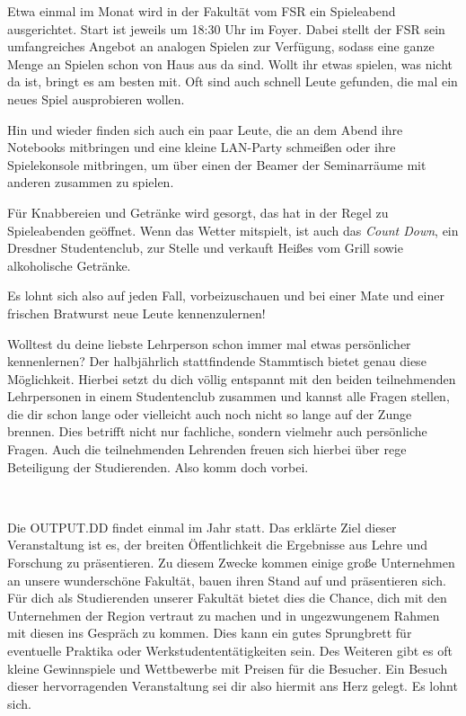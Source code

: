 

Etwa einmal im Monat wird in der Fakultät vom FSR ein Spieleabend ausgerichtet. Start ist jeweils um 18:30 Uhr im Foyer. Dabei stellt der FSR sein umfangreiches Angebot an analogen Spielen zur Verfügung, sodass eine ganze Menge an Spielen schon von Haus aus da sind. Wollt ihr etwas spielen, was nicht da ist, bringt es am besten mit. Oft sind auch schnell Leute gefunden, die mal ein neues Spiel ausprobieren wollen.

Hin und wieder finden sich auch ein paar Leute, die an dem Abend ihre Notebooks mitbringen und eine kleine LAN-Party schmeißen oder ihre Spielekonsole mitbringen, um über einen der Beamer der Seminarräume mit anderen zusammen zu spielen.

Für Knabbereien und Getränke wird gesorgt, das \ascii{} hat in der Regel zu Spieleabenden geöffnet. Wenn das Wetter mitspielt, ist auch das \emph{Count Down}, ein Dresdner Studentenclub, zur Stelle und verkauft Heißes vom Grill sowie alkoholische Getränke.

Es lohnt sich also auf jeden Fall, vorbeizuschauen und bei einer Mate und einer frischen Bratwurst neue Leute kennenzulernen!


Wolltest du deine liebste Lehrperson schon immer mal etwas persönlicher kennenlernen? Der halbjährlich stattfindende Stammtisch bietet genau diese Möglichkeit. Hierbei setzt du dich völlig entspannt mit den beiden teilnehmenden Lehrpersonen in einem Studentenclub zusammen und kannst alle Fragen stellen, die dir schon lange oder vielleicht auch noch nicht so lange auf der Zunge brennen. Dies betrifft nicht nur fachliche, sondern vielmehr auch persönliche Fragen. Auch die teilnehmenden Lehrenden freuen sich hierbei über rege Beteiligung der Studierenden. Also komm doch vorbei.

\pagebreak

\
\thispagestyle{empty}

\pagebreak


Die OUTPUT.DD findet einmal im Jahr statt. Das erklärte Ziel dieser Veranstaltung ist es, der breiten Öffentlichkeit die Ergebnisse aus Lehre und Forschung zu präsentieren. Zu diesem Zwecke kommen einige große Unternehmen an unsere wunderschöne Fakultät, bauen ihren Stand auf und präsentieren sich. Für dich als Studierenden unserer Fakultät bietet dies die Chance, dich mit den Unternehmen der Region vertraut zu machen und in ungezwungenem Rahmen mit diesen ins Gespräch zu kommen. Dies kann ein gutes Sprungbrett für eventuelle Praktika oder Werkstudententätigkeiten sein. Des Weiteren gibt es oft kleine Gewinnspiele und Wettbewerbe mit Preisen für die Besucher. Ein Besuch dieser hervorragenden Veranstaltung sei dir also hiermit ans Herz gelegt. Es lohnt sich.

